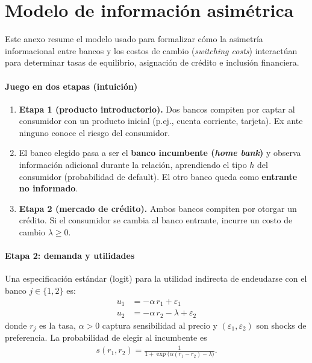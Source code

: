 \documentclass[11pt]{article}
\theoremstyle{plain}
\theoremstyle{plain}
\begin{document}
    \section*{Modelo de información asimétrica}
    \label{sec:modelo}
    {\small

    Este anexo resume el modelo  usado para formalizar cómo la asimetría informacional entre bancos y los costos de cambio (\textit{switching costs}) interactúan para determinar tasas de equilibrio, asignación de crédito e inclusión financiera.

    \paragraph{Juego en dos etapas (intuición)}
    \begin{enumerate}
        \item \textbf{Etapa 1 (producto introductorio).} Dos bancos compiten por captar al consumidor con un producto inicial (p.ej., cuenta corriente, tarjeta). Ex ante ninguno conoce el riesgo del consumidor.
        \item El banco elegido pasa a ser el \textbf{banco incumbente (\textit{home bank})} y observa información adicional durante la relación, aprendiendo el tipo $h$ del consumidor (probabilidad de default). El otro banco queda como \textbf{entrante no informado}.
        \item \textbf{Etapa 2 (mercado de crédito).} Ambos bancos compiten por otorgar un crédito. Si el consumidor se cambia al banco entrante, incurre un costo de cambio $\lambda\ge 0$.
    \end{enumerate}

    \paragraph{Etapa 2: demanda y utilidades}
    Una especificación estándar (logit) para la utilidad indirecta de endeudarse con el banco $j\in\{1,2\}$ es:
    \begin{align*}
        u_{1} &= -\alpha\, r_{1} + \varepsilon_{1}\\
        u_{2} &= -\alpha\, r_{2} - \lambda + \varepsilon_{2}
    \end{align*}
    donde $r_j$ es la tasa, $\alpha>0$ captura sensibilidad al precio y $(\varepsilon_1,\varepsilon_2)$ son shocks de preferencia. La probabilidad de elegir al incumbente es
    \begin{align*}
        s(r_1,r_2) = \frac{1}{1+\exp\!\big(\alpha(r_1-r_2)-\lambda\big)}.
    \end{align*}

}
\end{document}
